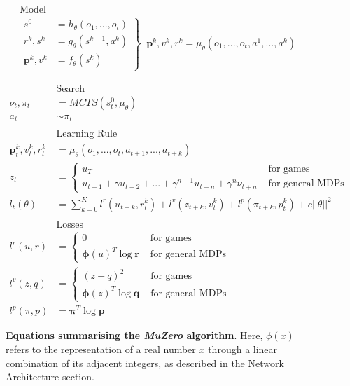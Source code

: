\documentclass{article}
\newcommand{\muzero}{\emph{MuZero}}
\begin{document}
\begin{figure} %

\begin{align*}
&\text{Model} \\
&\left.
\begin{array}{ll}
s^0 &= h_\theta(o_1, ..., o_t) \\
r^k, s^k &= g_\theta(s^{k-1}, a^k) \\
%
\mathbf{p}^k, v^k &= f_\theta(s^k)
\end{array}
\right\} \;\;
\mathbf{p}^k, v^k, r^k = \mu_\theta(o_1, ..., o_t, a^1, ..., a^k)
\end{align*}

\begin{align*}
&\text{Search}\\
\nu_t, \pi_t &= MCTS(s^0_t, \mu_\theta) \\
a_t &\sim \pi_t \\
\\
&\text{Learning Rule} \\
\mathbf{p}^k_t, v^k_t, r^k_t &= \mu_\theta(o_1, ..., o_t, a_{t+1}, ..., a_{t+k}) \\
z_t &= \left\{
\begin{array}{lr}
u_T
& \text{ for games } \\
u_{t+1} + \gamma u_{t+2} + ... + \gamma^{n-1} u_{t+n} + \gamma^n \nu_{t+n}
& \text{ for general MDPs }
\end{array}
\right. \\
l_t(\theta) &= \sum_{k=0}^K l^r (u_{t+k}, r_t^k) + l^v(z_{t+k}, v^k_t) + l^p(\pi_{t+k}, p^k_t)  + c ||\theta||^2 \\
\\
&\text{Losses} \\
l^r(u, r) &= \left\{
\begin{array}{lr}
0 & \text{ for games } \\
\boldsymbol{\phi}(u)^T \log \mathbf{r} & \text{ for general MDPs }
\end{array}
\right. \\
l^v(z, q) &= \left\{
\begin{array}{lr}
(z - q)^2 & \text{ for games } \\
\boldsymbol{\phi}(z)^T \log \mathbf{q} & \text{ for general MDPs }
\end{array}
\right. \\
l^p(\pi, p) &= \boldsymbol{\pi}^T \log \mathbf{p}
\end{align*}

\caption{
\label{fig:muzero_equations}
\textbf{Equations summarising the \muzero{} algorithm}. Here, $\phi(x)$ refers to the representation of a real number $x$ through a linear combination of its adjacent integers, as described in the Network Architecture section.
}
\end{figure} %
\end{document}
